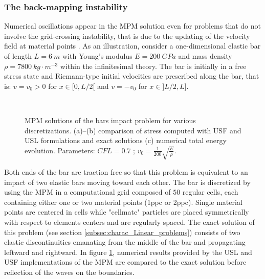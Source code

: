 \subsubsection*{The back-mapping instability}
Numerical oscillations appear in the MPM solution even for problems that do not involve the grid-crossing instability, that is due to the updating of the velocity field at material points \cite{Mass_Flip}. As an illustration, consider a one-dimensional elastic bar of length $L=6\:m$ with Young's modulus $E=200 \:GPa$ and mass density $\rho=7800 \:kg\cdot m^{-3}$ within the infinitesimal theory. The bar is initially in a free stress state and Riemann-type initial velocities are prescribed along the bar, that is: $v=v_0>0$ for $x\in[0,L/2[$ and $v=-v_0$ for $x \in ]L/2,L]$.
\begin{figure}[ht]
  \centering
  {  \label{subfig:US_diffusion_10}}
  {  \label{subfig:US_diffusion_25}}\\
  {  \label{subfig:US_energies}}
  \caption{MPM solutions of the bars impact problem for various discretizations. (a)--(b) comparison of stress computed with USF and USL formulations and exact solutions (c) numerical total energy evolution. Parameters: $CFL=0.7$ ; $v_0=\frac{1}{200}\sqrt{\frac{E}{\rho}}$.}
  \label{fig:US_diffusion}
\end{figure}
Both ends of the bar are traction free so that this problem is equivalent to an impact of two elastic bars moving toward each other. The bar is discretized by using the MPM in a computational grid composed of $50$ regular cells, each containing either one or two material points (1ppc or 2ppc). Single material points are centered in cells while "cellmate" particles are placed symmetrically with respect to elements centers and are regularly spaced. The exact solution of this problem (see section \ref{subsec:charac_Linear_problems}) consists of two elastic discontinuities emanating from the middle of the bar and propagating leftward and rightward. In figure \ref{fig:US_diffusion}, numerical results provided by the USL and USF implementations of the MPM are compared to the exact solution before reflection of the waves on the boundaries. 

